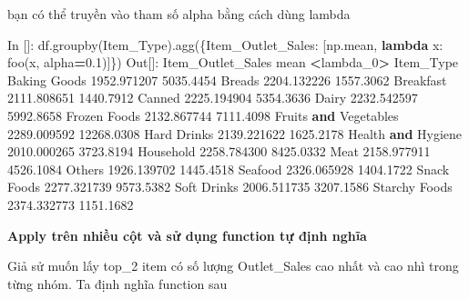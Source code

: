 \documentclass[
]{book}
\newenvironment{Shaded}{\begin{snugshade}}{\end{snugshade}}
\newcommand{\FloatTok}[1]{\textcolor[rgb]{0.00,0.00,0.81}{#1}}
\newcommand{\KeywordTok}[1]{\textcolor[rgb]{0.13,0.29,0.53}{\textbf{#1}}}
\newcommand{\NormalTok}[1]{#1}
\newcommand{\OperatorTok}[1]{\textcolor[rgb]{0.81,0.36,0.00}{\textbf{#1}}}
\newcommand{\StringTok}[1]{\textcolor[rgb]{0.31,0.60,0.02}{#1}}
\begin{document}
bạn có thể truyền vào tham số alpha bằng cách dùng lambda

\begin{Shaded}
\begin{Highlighting}[]
\NormalTok{In []: df.groupby(}\StringTok{\textquotesingle{}Item\_Type\textquotesingle{}}\NormalTok{).agg(\{}\StringTok{\textquotesingle{}Item\_Outlet\_Sales\textquotesingle{}}\NormalTok{: [np.mean, }\KeywordTok{lambda}\NormalTok{ x: foo(x, alpha}\OperatorTok{=}\FloatTok{0.1}\NormalTok{)]\})}
\NormalTok{Out[]: }
\NormalTok{                      Item\_Outlet\_Sales            }
\NormalTok{                                   mean  }\OperatorTok{\textless{}}\NormalTok{lambda\_0}\OperatorTok{\textgreater{}}
\NormalTok{Item\_Type                                          }
\NormalTok{Baking Goods                }\FloatTok{1952.971207}   \FloatTok{5035.4454}
\NormalTok{Breads                      }\FloatTok{2204.132226}   \FloatTok{1557.3062}
\NormalTok{Breakfast                   }\FloatTok{2111.808651}   \FloatTok{1440.7912}
\NormalTok{Canned                      }\FloatTok{2225.194904}   \FloatTok{5354.3636}
\NormalTok{Dairy                       }\FloatTok{2232.542597}   \FloatTok{5992.8658}
\NormalTok{Frozen Foods                }\FloatTok{2132.867744}   \FloatTok{7111.4098}
\NormalTok{Fruits }\KeywordTok{and}\NormalTok{ Vegetables       }\FloatTok{2289.009592}  \FloatTok{12268.0308}
\NormalTok{Hard Drinks                 }\FloatTok{2139.221622}   \FloatTok{1625.2178}
\NormalTok{Health }\KeywordTok{and}\NormalTok{ Hygiene          }\FloatTok{2010.000265}   \FloatTok{3723.8194}
\NormalTok{Household                   }\FloatTok{2258.784300}   \FloatTok{8425.0332}
\NormalTok{Meat                        }\FloatTok{2158.977911}   \FloatTok{4526.1084}
\NormalTok{Others                      }\FloatTok{1926.139702}   \FloatTok{1445.4518}
\NormalTok{Seafood                     }\FloatTok{2326.065928}   \FloatTok{1404.1722}
\NormalTok{Snack Foods                 }\FloatTok{2277.321739}   \FloatTok{9573.5382}
\NormalTok{Soft Drinks                 }\FloatTok{2006.511735}   \FloatTok{3207.1586}
\NormalTok{Starchy Foods               }\FloatTok{2374.332773}   \FloatTok{1151.1682}
\end{Highlighting}
\end{Shaded}

\textbf{Apply trên nhiều cột và sử dụng function tự định nghĩa}

Giả sử muốn lấy top\_2 item có số lượng Outlet\_Sales cao nhất và cao nhì trong từng nhóm. Ta định nghĩa function sau
\end{document}
